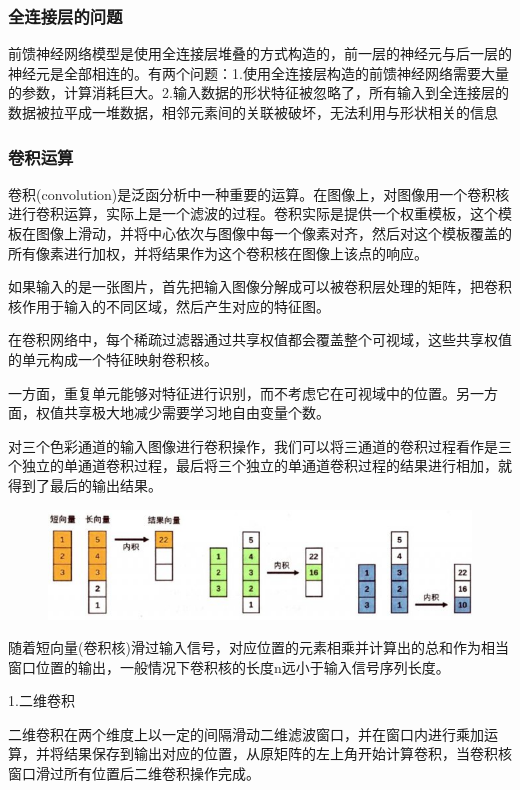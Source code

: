 \documentclass[openbib]{article}
\begin{document}
\subsubsection{全连接层的问题}
前馈神经网络模型是使用全连接层堆叠的方式构造的，前一层的神经元与后一层的神经元是全部相连的。有两个问题：1.使用全连接层构造的前馈神经网络需要大量的参数，计算消耗巨大。2.输入数据的形状特征被忽略了，所有输入到全连接层的数据被拉平成一堆数据，相邻元素间的关联被破坏，无法利用与形状相关的信息
\subsubsection{卷积运算}
卷积(convolution)是泛函分析中一种重要的运算。在图像上，对图像用一个卷积核进行卷积运算，实际上是一个滤波的过程。卷积实际是提供一个权重模板，这个模板在图像上滑动，并将中心依次与图像中每一个像素对齐，然后对这个模板覆盖的所有像素进行加权，并将结果作为这个卷积核在图像上该点的响应。

如果输入的是一张图片，首先把输入图像分解成可以被卷积层处理的矩阵，把卷积核作用于输入的不同区域，然后产生对应的特征图。

在卷积网络中，每个稀疏过滤器通过共享权值都会覆盖整个可视域，这些共享权值的单元构成一个特征映射卷积核。

一方面，重复单元能够对特征进行识别，而不考虑它在可视域中的位置。另一方面，权值共享极大地减少需要学习地自由变量个数。

对三个色彩通道的输入图像进行卷积操作，我们可以将三通道的卷积过程看作是三个独立的单通道卷积过程，最后将三个独立的单通道卷积过程的结果进行相加，就得到了最后的输出结果。
\begin{figure}[htbp]
	\centering
	\includegraphics[scale=0.7]{一维卷积运算}
\end{figure}

随着短向量(卷积核)滑过输入信号，对应位置的元素相乘并计算出的总和作为相当窗口位置的输出，一般情况下卷积核的长度n远小于输入信号序列长度。

1.二维卷积

二维卷积在两个维度上以一定的间隔滑动二维滤波窗口，并在窗口内进行乘加运算，并将结果保存到输出对应的位置，从原矩阵的左上角开始计算卷积，当卷积核窗口滑过所有位置后二维卷积操作完成。
\end{document}
